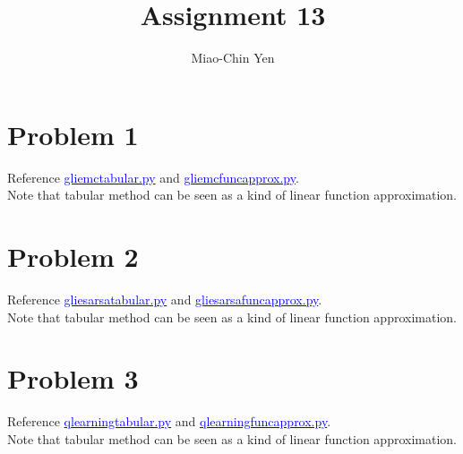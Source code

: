 \documentclass{article}
\title{Assignment 13}
\author{Miao-Chin Yen}
\begin{document}
\maketitle

\section*{Problem 1}
Reference   \href{https://github.com/miaochin/RL-book/tree/master/CME241_assignments/assignment13}{\textcolor{blue}{glie\textunderscore mc\textunderscore tabular.py}} and \href{https://github.com/miaochin/RL-book/tree/master/CME241_assignments/assignment13}{\textcolor{blue}{glie\textunderscore mc\textunderscore func\textunderscore approx.py}}.\\
Note that tabular method can be seen as a kind of linear function approximation.


\section*{Problem 2}
Reference   \href{https://github.com/miaochin/RL-book/tree/master/CME241_assignments/assignment13}{\textcolor{blue}{glie\textunderscore sarsa\textunderscore tabular.py}} and \href{https://github.com/miaochin/RL-book/tree/master/CME241_assignments/assignment13}{\textcolor{blue}{glie\textunderscore sarsa\textunderscore func\textunderscore approx.py}}.\\
Note that tabular method can be seen as a kind of linear function approximation.

\section*{Problem 3}
Reference   \href{https://github.com/miaochin/RL-book/tree/master/CME241_assignments/assignment13}{\textcolor{blue}{q\textunderscore learning\textunderscore tabular.py}} and \href{https://github.com/miaochin/RL-book/tree/master/CME241_assignments/assignment13}{\textcolor{blue}{q\textunderscore learning\textunderscore func\textunderscore approx.py}}.\\
Note that tabular method can be seen as a kind of linear function approximation.
\end{document}
